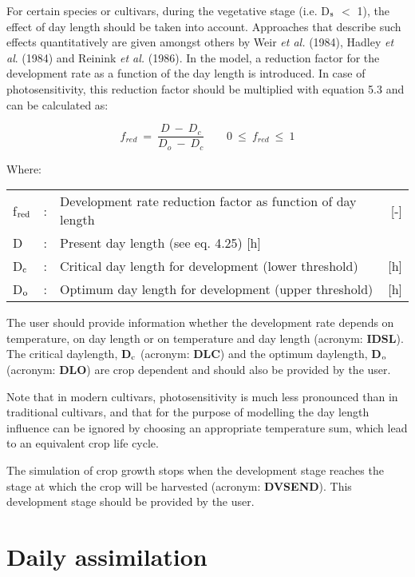 For certain species or cultivars, during the vegetative stage (i.e. D$_{{\rm s}}$ $<$ 1), the effect of
day length should be taken into account. Approaches that describe such effects quantita\-tively are given amongst others by  Weir {\it et al.} (1984), Hadley {\it et al}. (1984) and Reinink {\it et al.} (1986). In the model, a reduction factor for the development rate as a function of the day length is intro\-duced. In case of photosensitivity, this reduction factor should be multiplied with equation 5.3 and can be calculated as:

\begin{equation}
f _{red} ~=~{\frac{D ~-~D _{c} }{D _{o} ~-~ D _{c} }} ~~~~~~~~~0~\le ~f _{red} ~\le ~1
\end{equation}

Where:\\[5pt]
\begin{tabularx}{\textwidth}{llXr}
f$_{{\rm red}}$ &:& Development rate reduction factor as function of day length   &     [-]\\
D &:& Present day length (see eq. 4.25)        [h]\\
D$_{{\rm c}}$ &:& Critical day length for development (lower threshold)    &    [h]\\
D$_{{\rm o}}$ &:& Optimum day length for development (upper threshold)    &    [h]\\
\end{tabularx}

The user should provide information whether the development rate depends on tempera\-ture, on day length or on temperature and day length (acronym: {\bf IDSL}). The critical
daylength, {\bf D$_{{\rm c}}$} (acronym: {\bf DLC}) and the optimum daylength, {\bf D$_{{\rm o}}$} (acronym: {\bf DLO}) are crop depen\-dent and should also be provided by the user. 

Note that in modern cultivars, photosen\-sitivity is much less pronounced than in traditional
cultivars, and that for the purpose of modelling the day length influence can be ignored
by choosing an appropriate temperature sum, which lead to  an equivalent crop life cycle.

The simulation of crop growth stops when the development stage reaches the stage at
which the crop will be harvested (acronym: {\bf DVSEND}). This development stage should be
provided by the user. 

\section{Daily assimilation  } 

